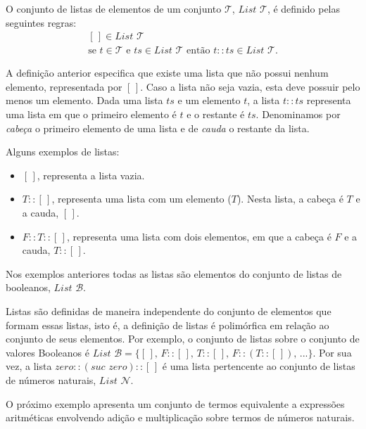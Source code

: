 \begin{Definition}
  O conjunto de listas de elementos de um conjunto $\mathcal{T}$, $\textit{List }\mathcal{T}$, \'e definido pelas seguintes regras:
  \[
  \begin{array}{l}
    [\,] \in \textit{List }\mathcal{T}\\
    \text{se }t \in \mathcal{T} \text{ e } ts \in \textit{List }\mathcal{T}\text{ ent\~ao } t :: ts \in \textit{List }\mathcal{T}.
  \end{array}
  \]
\end{Definition}
A defini\c{c}\~ao anterior especifica que existe uma lista que n\~ao possui nenhum elemento, representada por $[\,]$. Caso a lista
n\~ao seja vazia, esta deve possuir pelo menos um elemento. Dada uma lista $ts$ e um elemento $t$, a lista $t :: ts$ representa uma
lista em que o primeiro elemento \'e $t$ e o restante \'e $ts$. Denominamos por \textit{cabe\c{c}a} o primeiro elemento de uma lista
e de \textit{cauda} o restante da lista.

\begin{Example}
Alguns exemplos de listas:
\begin{itemize}
  \item $[\,]$, representa a lista vazia.
  \item $T :: [\,]$, representa uma lista com um elemento ($T$). Nesta lista, a cabe\c{c}a \'e $T$ e a cauda, $[\,]$.
  \item $F :: T :: [\,]$, representa uma lista com dois elementos, em que a cabe\c{c}a \'e $F$ e a cauda, $T :: [\,]$.
\end{itemize}
Nos exemplos anteriores todas as listas s\~ao elementos do conjunto de listas de booleanos, $\textit{List }\mathcal{B}$.
\end{Example}

Listas s\~ao definidas de maneira independente do conjunto de elementos que formam essas listas, isto \'e, a defini\c{c}\~ao de listas
\'e polim\'orfica em rela\c{c}\~ao ao conjunto de seus elementos.
Por exemplo, o conjunto de listas sobre 
o conjunto de valores Booleanos \'e $\textit{List }\mathcal{B}=\{[\,],\,F :: [\,],\,T :: [\,],\, F :: (T :: [\,]),\, ...\}$. Por sua vez, a lista
$zero :: (suc\,\,zero) :: [\,]$ \'e uma lista pertencente ao conjunto de listas de n\'umeros naturais, $\textit{List }\mathcal{N}$.

O pr\'oximo exemplo apresenta um conjunto de termos equivalente a express\~oes aritm\'eticas envolvendo adi\c{c}\~ao e multiplica\c{c}\~ao
sobre termos de n\'umeros naturais.

